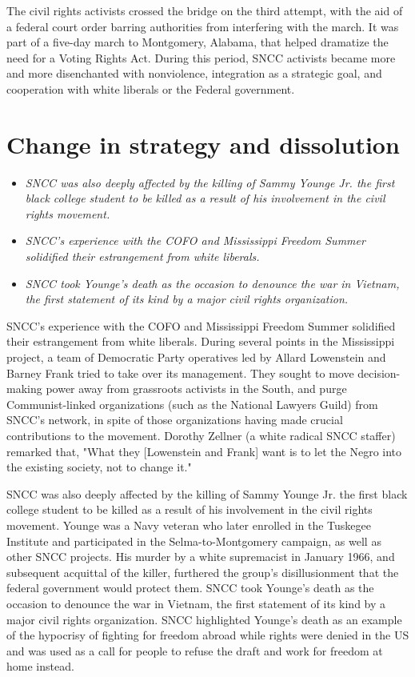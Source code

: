 The civil rights activists crossed the bridge on the third attempt, with
the aid of a federal court order barring authorities from interfering
with the march. It was part of a five-day march to Montgomery, Alabama,
that helped dramatize the need for a Voting Rights Act. During this
period, SNCC activists became more and more disenchanted with
nonviolence, integration as a strategic goal, and cooperation with white
liberals or the Federal government.

\section{Change in strategy and
dissolution}\label{change-in-strategy-and-dissolution}

\begin{itemize}
\item
  \emph{SNCC was also deeply affected by the killing of Sammy Younge Jr.
  the first black college student to be killed as a result of his
  involvement in the civil rights movement.}
\item
  \emph{SNCC's experience with the COFO and Mississippi Freedom Summer
  solidified their estrangement from white liberals.}
\item
  \emph{SNCC took Younge's death as the occasion to denounce the war in
  Vietnam, the first statement of its kind by a major civil rights
  organization.}
\end{itemize}

SNCC's experience with the COFO and Mississippi Freedom Summer
solidified their estrangement from white liberals. During several points
in the Mississippi project, a team of Democratic Party operatives led by
Allard Lowenstein and Barney Frank tried to take over its management.
They sought to move decision-making power away from grassroots activists
in the South, and purge Communist-linked organizations (such as the
National Lawyers Guild) from SNCC's network, in spite of those
organizations having made crucial contributions to the movement. Dorothy
Zellner (a white radical SNCC staffer) remarked that, "What they
{[}Lowenstein and Frank{]} want is to let the Negro into the existing
society, not to change it."

SNCC was also deeply affected by the killing of Sammy Younge Jr. the
first black college student to be killed as a result of his involvement
in the civil rights movement. Younge was a Navy veteran who later
enrolled in the Tuskegee Institute and participated in the
Selma-to-Montgomery campaign, as well as other SNCC projects. His murder
by a white supremacist in January 1966, and subsequent acquittal of the
killer, furthered the group's disillusionment that the federal
government would protect them. SNCC took Younge's death as the occasion
to denounce the war in Vietnam, the first statement of its kind by a
major civil rights organization. SNCC highlighted Younge's death as an
example of the hypocrisy of fighting for freedom abroad while rights
were denied in the US and was used as a call for people to refuse the
draft and work for freedom at home instead.

